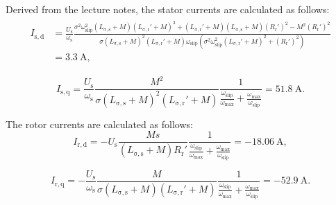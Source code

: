 
\begin{solutionblock}
    Derived from the lecture notes, the stator currents are calculated as follows:
    \begin{align}
        \begin{split}
        I_{\mathrm{s,d}} &= \frac{U_{\mathrm{s}}}{\omega_{\mathrm{s}}} \frac{\sigma^2\omega_{\mathrm{slip}}^2 \left(L_{\mathrm{\sigma,s}}+M\right)\left(L_{\mathrm{\sigma,r}}'+M\right)^3 + \left(L_{\mathrm{\sigma,r}}'+M\right)\left(L_{\mathrm{\sigma,s}}+M\right)\left(R_{\mathrm{r}}'\right)^2 - M^2 \left(R_{\mathrm{r}}'\right)^2}{\sigma \left(L_{\mathrm{\sigma,s}}+M\right)^2 \left(L_{\mathrm{\sigma,r}}'+M\right)\omega_{\mathrm{slip}}\left(\sigma^2 \omega_{\mathrm{slip}}^2 \left(L_{\mathrm{\sigma,r}}'+M\right)^2 + \left(R_{\mathrm{r}}'\right)^2\right)}\\
        &= \SI{3.3}{\ampere},
        \end{split}
    \end{align}
    
    \begin{equation}
        I_{\mathrm{s,q}} = \frac{U_{\mathrm{s}}}{\omega_{\mathrm{s}}} \frac{M^2}{\sigma\left(L_{\mathrm{\sigma,s}}+M\right)^2 \left(L_{\mathrm{\sigma,r}}'+M\right)} \frac{1}{\frac{\omega_{\mathrm{slip}}}{\omega_{\mathrm{max}}} + \frac{\omega_{\mathrm{max}}}{\omega_{\mathrm{slip}}}}
        = \SI{51.8}{\ampere}.
    \end{equation}
    
    
    The rotor currents are calculated as follows:
    \begin{equation}
        I_{\mathrm{r,d}} = -U_{\mathrm{s}} \frac{M s}{\left(L_{\mathrm{\sigma,s}}+M\right) R_{\mathrm{r}}'}\frac{1}{\frac{\omega_{\mathrm{slip}}}{\omega_{\mathrm{max}}} + \frac{\omega_{\mathrm{max}}}{\omega_{\mathrm{slip}}}}
        = \SI{-18.06}{\ampere},
    \end{equation}

    \begin{equation}
        I_{\mathrm{r,q}} = -\frac{U_{\mathrm{s}}}{\omega_{\mathrm{s}}}\frac{M}{\sigma \left(L_{\mathrm{\sigma,s}}+M\right)\left(L_{\mathrm{\sigma,r}}'+M\right)}\frac{1}{\frac{\omega_{\mathrm{slip}}}{\omega_{\mathrm{max}}} + \frac{\omega_{\mathrm{max}}}{\omega_{\mathrm{slip}}}}
        = \SI{-52.9}{\ampere}.
    \end{equation}

    

\end{solutionblock}


